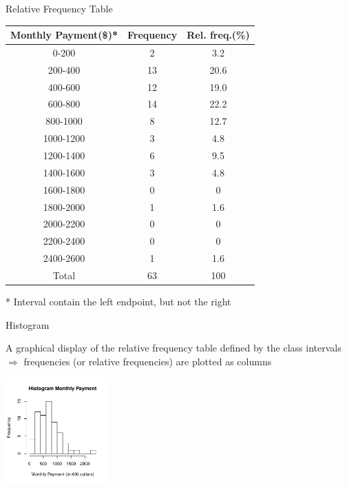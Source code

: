 \documentclass[14pt]{beamer}\usepackage[]{graphicx}\usepackage[]{color}
\begin{document}
\begin{frame}[fragile]{Relative Frequency Table}

{\scriptsize{
\begin{tabular}{@{} ccc @{}} \hline
Monthly Payment(\$)* & Frequency & Rel. freq.(\%) \\ \hline
0-200 & 2 & 3.2 \\
200-400 & 13 & 20.6 \\
400-600 & 12 & 19.0 \\
600-800 & 14 & 22.2 \\
800-1000 & 8 & 12.7 \\
1000-1200 & 3 & 4.8 \\
1200-1400 & 6 & 9.5 \\
1400-1600 & 3 & 4.8 \\
1600-1800 & 0 & 0 \\
1800-2000 & 1 & 1.6 \\
2000-2200 & 0 & 0 \\
2200-2400 & 0 & 0 \\
2400-2600 & 1 & 1.6 \\ \hline
Total     & 63 & 100 \\ \hline
\end{tabular}
}}

* Interval contain the left endpoint, but not the right
\end{frame}

\begin{frame}[fragile]{Histogram}

{\small{
A graphical display of the relative frequency table defined by the class  intervals \\
$\Rightarrow$ frequencies (or relative frequencies) are plotted as columns
}}

\begin{center}


\includegraphics[width=4cm]{figure/LBL2e-1} 


\end{center}
\end{frame}
\end{document}

